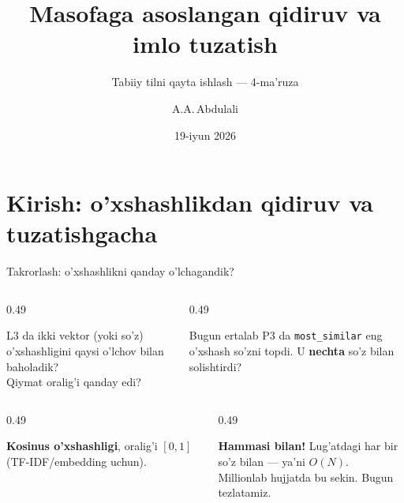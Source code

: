 \documentclass[aspectratio=169,11pt]{beamer}
\title[Qidiruv va imlo tuzatish]{Masofaga asoslangan qidiruv va imlo tuzatish}
\subtitle{Tabiiy tilni qayta ishlash --- 4-ma'ruza}
\author[A.A.\,Abdulali]{A.A.\,Abdulali}
\date{19-iyun 2026}
\institute{11:00--12:20 \quad$\cdot$\quad mavzu \textnumero{}4}
\begin{document}

\maketitle

\section[Kirish]{Kirish: o'xshashlikdan qidiruv va tuzatishgacha}

\begin{frame}{Takrorlash: o'xshashlikni qanday o'lchagandik?}
  \begin{columns}[T]
    \begin{column}{0.49\textwidth}
      \begin{tcolorbox}[warnbox,title=1-savol]
        \small
        L3 da ikki vektor (yoki so'z) o'xshashligini qaysi o'lchov bilan
        baholadik?\\[3pt]
        \footnotesize Qiymat oralig'i qanday edi?
      \end{tcolorbox}
    \end{column}
    \begin{column}{0.49\textwidth}
      \begin{tcolorbox}[warnbox,title=2-savol]
        \small
        Bugun ertalab P3 da \texttt{most\_similar} eng o'xshash so'zni
        topdi. U \textbf{nechta} so'z bilan solishtirdi?
      \end{tcolorbox}
    \end{column}
  \end{columns}
  \pause
  \vspace{4pt}
  \begin{columns}[T]
    \begin{column}{0.49\textwidth}
      \begin{tcolorbox}[okbox,title=1-javob]
        \small
        \textbf{Kosinus o'xshashligi}, oralig'i $[0,1]$
        (TF-IDF/embedding uchun).
      \end{tcolorbox}
    \end{column}
    \begin{column}{0.49\textwidth}
      \begin{tcolorbox}[okbox,title=2-javob]
        \small
        \textbf{Hammasi bilan!} Lug'atdagi har bir so'z bilan --- ya'ni
        $O(N)$.\\
        \footnotesize\textcolor{halfgray}{Millionlab hujjatda bu sekin. Bugun tezlatamiz.}
      \end{tcolorbox}
    \end{column}
  \end{columns}
\end{frame}
\end{document}
